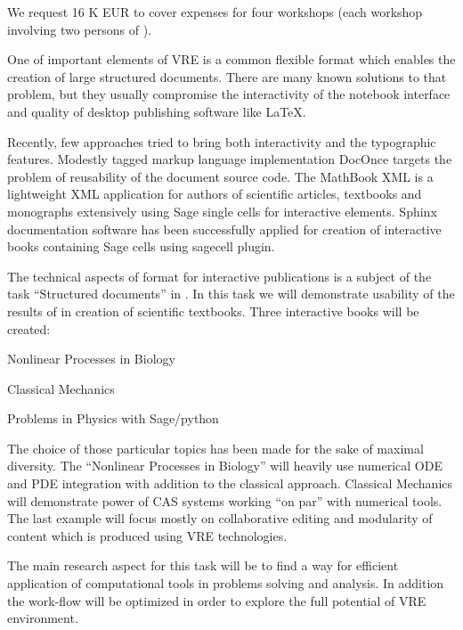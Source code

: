 \begin{workpackage}
\begin{tasklist}
\begin{task}[title=workshops in developing countries]
We request 16 K EUR to cover expenses for four workshops (each workshop involving
two persons of \TheProject).

\end{task}

\begin{task}[title=Demonstrator: interactive books,
id=ibook]

One of important elements of VRE is a common flexible format which
enables the creation of large structured documents. There are many
known solutions to that problem, but they usually compromise the
interactivity of the notebook interface and quality of desktop
publishing software like LaTeX. 

Recently, few approaches tried to bring both interactivity and the
typographic features. Modestly tagged markup language implementation
DocOnce targets the problem of reusability of the document source
code. The MathBook XML is a lightweight XML application for authors of
scientific articles, textbooks and monographs extensively using Sage
single cells for interactive elements. Sphinx documentation software
has been successfully applied for creation of interactive books
containing Sage cells using sagecell plugin. 

The technical aspects of format for interactive publications is a
subject of the task ``Structured documents'' in
. In this task we will demonstrate usability
of the results of  in creation of scientific
textbooks. Three interactive books will be created:

\begin{compactitem}
\item Nonlinear Processes in Biology 
\item Classical Mechanics  
\item Problems  in Physics with Sage/python    
\end{compactitem}

The choice of those particular topics has been made for the sake of maximal diversity. The ``Nonlinear Processes in Biology'' will heavily use numerical ODE and PDE integration with addition to the classical approach. Classical Mechanics will demonstrate power of CAS systems working ``on par'' with numerical tools. The last example will focus mostly on collaborative editing and modularity of content which is produced using VRE technologies. 

The main research aspect for this task will be to find a way for efficient application of computational tools in problems solving and analysis. In addition the work-flow will be optimized in order to explore the full potential of VRE environment. 


\end{task}
\end{tasklist}
\end{workpackage}
